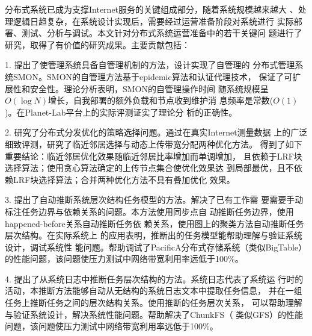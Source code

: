 \begin{cabstract}


  分布式系统已成为支撑Internet服务的关键组成部分，随着系统规模越来越大
  、处理逻辑日趋复杂，在系统设计实现后，需要经过运营准备阶段对系统进行
  实际部署、测试、分析与调试。本文针对分布式系统运营准备中的若干关键问
  题进行了研究，取得了有价值的研究成果。主要贡献包括：

    1. 提出了使管理系统具备自管理机制的方法，设计实现了自管理的
    分布式管理系统SMON。SMON的自管理方法基于epidemic算法和认证代理技术，
    保证了可扩展性和安全性。理论分析表明，SMON的自管理操作时间
    随系统规模呈$O(\log N)$增长，自我部署的额外负载和节点收到维护消
    息频率是常数($O(1)$)。在Planet-Lab平台上的实际评测证实了理论分
    析的正确性。

    2. 研究了分布式分发优化的策略选择问题。通过在真实Internet测量数据
    上的广泛细致评测，研究了临近邻居选择与动态上传带宽分配两种优化方法。
    得到了如下重要结论：临近邻居优化效果随临近邻居比率增加而单调增加，
    且依赖于LRF块选择算法；使用贪心算法确定的上传节点集合使优化效果达
    到局部最优，且不依赖LRF块选择算法；合并两种优化方法不具有叠加优化
    效果。

    3. 提出了自动推断系统层次结构任务模型的方法。解决了已有工作需
    要需要手动标注任务边界与依赖关系的问题。本方法使用同步点自
    动推断任务边界，使用happened-before关系自动推断任务依
    赖关系，使用图上的聚类方法自动推断任务层次结构。在实际系统上
    的应用表明，推断出的任务模型能帮助理解与验证系统设计，调试系统性
    能问题。帮助调试了PacificA分布式存储系统（类似BigTable）
    的性能问题，该问题使压力测试中网络带宽利用率远低于100\%。

    4. 提出了从系统日志中推断任务层次结构的方法。系统日志代表了系统运
    行时的活动，本推断方法能够自动从无结构的系统日志文本中提取任务信息，
    并在一组任务上推断任务之间的层次结构关系。使用推断的任务层次关系，
    可以帮助理解与验证系统设计，解决系统性能问题。帮助解决了ChunkFS（
    类似GFS）的性能问题，该问题使压力测试中网络带宽利用率远低于100\%。


\end{cabstract}


